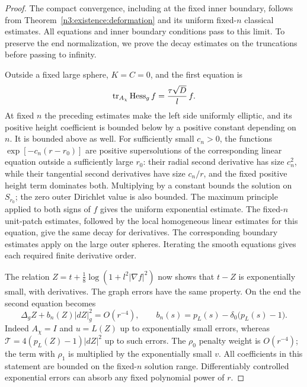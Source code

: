 \begin{proof}
The compact convergence, including at the fixed inner boundary, follows
from Theorem~\ref{n3:existence:deformation} and its uniform fixed-\(n\)
classical estimates. All equations and inner boundary conditions pass
to this limit. To preserve the end normalization, we prove the decay
estimates on the truncations before passing to infinity.

Outside a fixed large sphere, \(K=C=0\), and the first equation is
\[
 \operatorname{tr}_{A_\chi}\operatorname{Hess}_g f=\frac{\tau\sqrt D}{l}\,f.
\]
At fixed \(n\) the preceding estimates make the left side uniformly
elliptic, and its positive height coefficient is bounded below by a
positive constant depending on \(n\). It is bounded above as well.
For sufficiently small \(c_n>0\), the functions
\(\exp[-c_n(r-r_0)]\) are positive supersolutions of the corresponding
linear equation outside a sufficiently large \(r_0\): their radial
second derivative has size \(c_n^2\), while their tangential second
derivatives have size \(c_n/r\), and the fixed positive height term
dominates both. Multiplying by a constant bounds the solution on
\(S_{r_0}\); the zero outer Dirichlet value is also bounded.
The maximum principle applied to both signs of \(f\) gives the
uniform exponential estimate. The fixed-\(n\) unit-patch estimates,
followed by the local homogeneous linear estimates for this equation,
give the same decay for derivatives. The corresponding boundary
estimates apply on the large outer spheres. Iterating the smooth
equations gives each required finite derivative order.

The relation \(Z=t+\tfrac18\log(1+l^2|\nabla f|^2)\) now shows that
\(t-Z\) is exponentially small, with derivatives. The graph errors
have the same property. On the end the second equation becomes
\begin{equation}\label{n3:limit:Z-end}
 \Delta_gZ+b_n(Z)|dZ|_g^2=O(r^{-4}),\qquad
 b_n(s)=p_L(s)-\delta_0\bigl(p_L(s)-1\bigr).
\end{equation}
Indeed \(A_\chi=I\) and \(u=L(Z)\) up to exponentially small errors,
whereas
\(\mathcal T=4(p_L(Z)-1)|dZ|^2\) up to such errors.
The \(\rho_0\) penalty weight is \(O(r^{-4})\); the term with
\(\rho_1\) is multiplied by the exponentially small \(v\).
All coefficients in this statement are bounded on the fixed-\(n\)
solution range. Differentiably controlled exponential errors can
absorb any fixed polynomial power of \(r\).


\end{proof}
